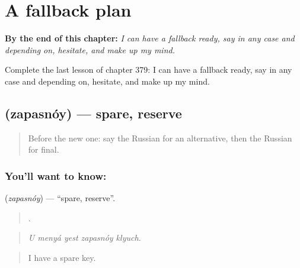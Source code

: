 
\chapter{A fallback plan}
\label{ch:ru-a-fallback-plan}

\begin{chapteropening}
\textbf{By the end of this chapter:} \emph{I can have a fallback ready, say in any case and depending on, hesitate, and make up my mind.}

Complete the last lesson of chapter 379: I can have a fallback ready, say in any case and depending on, hesitate, and make up my mind.
\end{chapteropening}

\section[\texorpdfstring{\ru{запасной} (zapasnóy)}{запасной (zapasnóy)}]{ (zapasnóy) — spare, reserve}

\label{lesson:RU-C379-zapasnoy}



\begin{quote}
Before the new one: say the Russian for an alternative, then the Russian for final.
\end{quote}

\subsection*{You'll want to know: }
\textbf{} (\emph{zapasnóy}) — \textquotedblleft{}spare, reserve\textquotedblright{}.

\begin{quote}
    .
\end{quote}

\begin{quote}
\emph{U menyá yest zapasnóy klyuch.}
\end{quote}

\begin{quote}
I have a spare key.
\end{quote}

